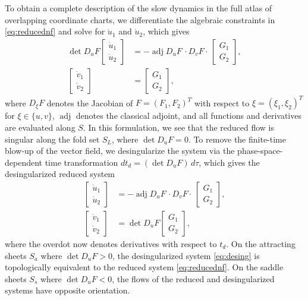 \documentclass[10pt,onecolumn]{article}
\theoremstyle{plain}
\begin{document}
To obtain a complete description of the slow dynamics in the full atlas of overlapping coordinate charts, we differentiate the algebraic constraints in \eqref{eq:reducednf} and solve for $\dot u_1$ and $\dot u_2$, which gives
%
\begin{equation}  \label{eq:reducednfatlas}
  \begin{split}
    \det D_u F \begin{bmatrix} \dot u_1 \\ \dot u_2 \end{bmatrix} &= -\operatorname{adj}D_u F \, \cdot  D_v F \cdot \, \begin{bmatrix} G_1 \\ G_2 \end{bmatrix}, \\ 
    \begin{bmatrix} \dot v_1 \\ \dot v_2 \end{bmatrix} &= \begin{bmatrix} G_1 \\ G_2 \end{bmatrix},
  \end{split}
\end{equation}
%
where $D_{\xi} F$ denotes the Jacobian of $F = (F_1, F_2)^T$ with respect to $\xi = (\xi_1, \xi_2)^T$ for $\xi \in \{ u,v \}$, $\operatorname{adj}$ denotes the classical adjoint, and all functions and derivatives are evaluated along $S$. 
In this formulation, we see that the reduced flow is singular along the fold set $S_L$, where $\det D_u F = 0$. To remove the finite-time blow-up of the vector field, we desingularize the system via the phase-space-dependent time transformation $dt_d = (\det D_u F)\,d\tau$, which gives the desingularized reduced system
%
\begin{equation} \label{eq:desing}
  \begin{split}
    \begin{bmatrix} \dot u_1 \\ \dot u_2 \end{bmatrix} &= -\operatorname{adj}D_u F \, \cdot  D_v F \cdot \, \begin{bmatrix} G_1 \\ G_2 \end{bmatrix}, \\ 
    \begin{bmatrix} \dot v_1 \\ \dot v_2 \end{bmatrix} &= \det D_u F  \begin{bmatrix} G_1 \\ G_2 \end{bmatrix},
  \end{split}
\end{equation}
%
where the overdot now denotes derivatives with respect to $t_d$. On the attracting sheets $S_a$ where $\det D_u F > 0$, the desingularized system \eqref{eq:desing} is topologically equivalent to the reduced system \eqref{eq:reducednf}. On the saddle sheets $S_s$ where $\det D_u F <0$, the flows of the reduced and desingularized systems have opposite orientation.
\end{document}
